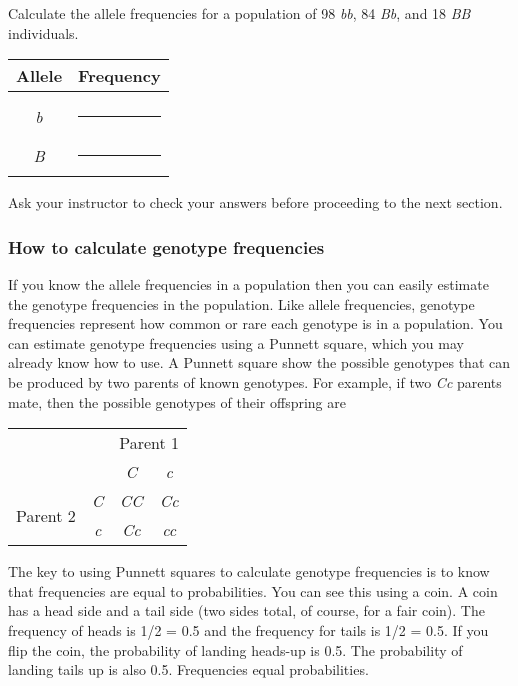 \documentclass[12pt]{exam}
\newcommand{\allele}[1]{\textit{#1}}
\begin{document}
\begin{questions}

\question
Calculate the allele frequencies for a population of 98 \allele{bb}, 84 \allele{Bb}, and 18 \allele{BB} individuals.

\begin{tabular}{@{}cc@{}}
	\toprule
	Allele & Frequency\tabularnewline
	\midrule
	 & \tabularnewline
	\allele{b} & \rule{0.5in}{0.4pt}\tabularnewline[2em]
	\allele{B} & \rule{0.5in}{0.4pt}\tabularnewline
	\bottomrule 
\end{tabular}

\vspace*{\baselineskip}

Ask your instructor to check your answers before proceeding to the next section. 

\newpage

\subsubsection*{How to calculate genotype frequencies}

If you know the allele frequencies in a population then you can easily estimate the genotype frequencies in the population. Like allele frequencies, genotype frequencies represent how common or rare each genotype is in a population.  You can estimate genotype frequencies using a Punnett square, which you may already know how to use.  A Punnett square show the possible genotypes that can be produced by two parents of known genotypes. For example, if two \allele{Cc} parents mate, then the possible genotypes of their offspring are

\begin{center}
	\begin{tabular}{cc|c|c|}
		\multicolumn{2}{c}{}	& \multicolumn{2}{c}{Parent 1}\tabularnewline
		\multicolumn{2}{c}{}	& \multicolumn{1}{c}{\allele{C}}	& \multicolumn{1}{c}{\allele{c}} \tabularnewline
		\cline{3-4}
		\multirow{2}{*}{Parent 2}	& \allele{C}	& \allele{CC}	& \allele{Cc} \tabularnewline
		\cline{3-4}
				&	\allele{c} & \allele{Cc}	& \allele{cc}	\tabularnewline
		\cline{3-4}
	\end{tabular}
\end{center}

\bigskip

The key to using Punnett squares to calculate genotype frequencies is to know that frequencies are equal to probabilities. You can see this using a coin.  A coin has a head side and a tail side (two sides total, of course, for a fair coin). The frequency of heads is 1/2 = 0.5 and the frequency for tails is 1/2 = 0.5.  If you flip the coin, the probability of landing heads-up is 0.5. The probability of landing tails up is also 0.5. Frequencies equal probabilities.


\end{questions}
\end{document}
